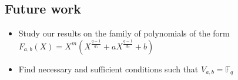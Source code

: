 \documentclass{article}
\theoremstyle{definition}
\theoremstyle{remark}
\numberwithin{equation}{section}
\begin{document}
\subsection{Future work}    

    \begin{itemize}
    \item Study our results on the family of polynomials of the form $F_{a,b}(X) = X^m(X^{\frac{q-1}{d_1}} + aX^{\frac{q-1}{d_2}} +b)$
    \item Find necessary and sufficient conditions such that $V_{a,b} = \mathbb{F}_q$
  \end{itemize}
 
  
\end{document}
